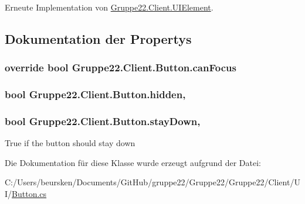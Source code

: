 Erneute Implementation von \hyperlink{class_gruppe22_1_1_client_1_1_u_i_element_a7d3595683a3f3e3a18788301e432204a}{Gruppe22.\-Client.\-U\-I\-Element}.



\subsection{Dokumentation der Propertys}
\hypertarget{class_gruppe22_1_1_client_1_1_button_ad3dd3b1d92337b7996d2b31dc0475e7c}{
\subsubsection[{can\-Focus}]{\setlength{\rightskip}{0pt plus 5cm}override bool Gruppe22.\-Client.\-Button.\-can\-Focus\hspace{0.3cm}{\ttfamily [get]}}}\label{class_gruppe22_1_1_client_1_1_button_ad3dd3b1d92337b7996d2b31dc0475e7c}
\hypertarget{class_gruppe22_1_1_client_1_1_button_af4263fb04d3c59dd99f446de88155d10}{
\subsubsection[{hidden}]{\setlength{\rightskip}{0pt plus 5cm}bool Gruppe22.\-Client.\-Button.\-hidden\hspace{0.3cm}{\ttfamily [get]}, {\ttfamily [set]}}}\label{class_gruppe22_1_1_client_1_1_button_af4263fb04d3c59dd99f446de88155d10}
\hypertarget{class_gruppe22_1_1_client_1_1_button_a82abfd338b674d43550df2deca15e07b}{
\subsubsection[{stay\-Down}]{\setlength{\rightskip}{0pt plus 5cm}bool Gruppe22.\-Client.\-Button.\-stay\-Down\hspace{0.3cm}{\ttfamily [get]}, {\ttfamily [set]}}}\label{class_gruppe22_1_1_client_1_1_button_a82abfd338b674d43550df2deca15e07b}


True if the button should stay down 



Die Dokumentation für diese Klasse wurde erzeugt aufgrund der Datei\-:\begin{DoxyCompactItemize}
\item 
C\-:/\-Users/beursken/\-Documents/\-Git\-Hub/gruppe22/\-Gruppe22/\-Gruppe22/\-Client/\-U\-I/\hyperlink{_button_8cs}{Button.\-cs}\end{DoxyCompactItemize}
